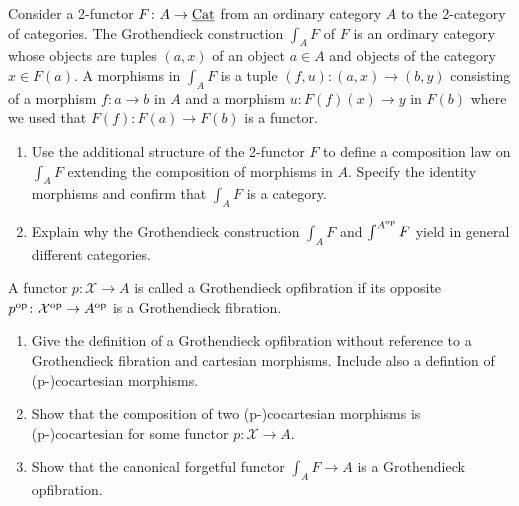 \begin{Exercise}
	Consider a 2-functor $ F \colon A \to \underline{ \operatorname{Cat} } $ from an ordinary category $ A $ to the 2-category of categories.
	The Grothendieck construction $ \int_A F $ of $ F $ is an ordinary category whose objects are tuples $ ( a , x ) $ of an object $ a \in A $ and objects of the category $ x \in F ( a ) $.
	A morphisms in $ \int_A F $ is a tuple $ ( f , u ) \colon ( a , x ) \to ( b , y ) $
	consisting of a morphism $ f \colon a \to b $ in $ A $ and a morphism $ u \colon F ( f ) ( x ) \to y $ in $ F ( b ) $ where we used that $ F ( f ) \colon F ( a ) \to F ( b ) $ is a functor.
	
	\begin{enumerate}[label=(\alph*)]
		\item 
		Use the additional structure of the 2-functor $ F $ to define a composition law on $ \int_A F $ extending the composition of morphisms in $ A $.
		Specify the identity morphisms and confirm that $ \int_A F $ is a category.
		
		\item 
		Explain why the Grothendieck construction $ \int_A F $ and $ \int^{ A^{ \operatorname{op} } } F $ yield in general different categories.
	\end{enumerate}
	
	A functor $ p \colon \mathcal{ X } \to A $ is called a Grothendieck opfibration if its opposite $ p^{ \operatorname{op} } \colon \mathcal{ X }^{ \operatorname{op} } \to A^{ \operatorname{op} } $ is a Grothendieck fibration.
	
	\begin{enumerate}[resume, label=(\alph*)]
		\item 
		Give the definition of a Grothendieck opfibration without reference to a Grothendieck fibration and cartesian morphisms. 
		Include also a defintion of (p-)cocartesian morphisms.
		
		\item 
		Show that the composition of two (p-)cocartesian morphisms is (p-)cocartesian for some functor $ p \colon \mathcal{ X } \to A $.
		
		\item 
		Show that the canonical forgetful functor $ \int_A F \to  A $ is a Grothendieck opfibration.
	\end{enumerate}
\end{Exercise}

